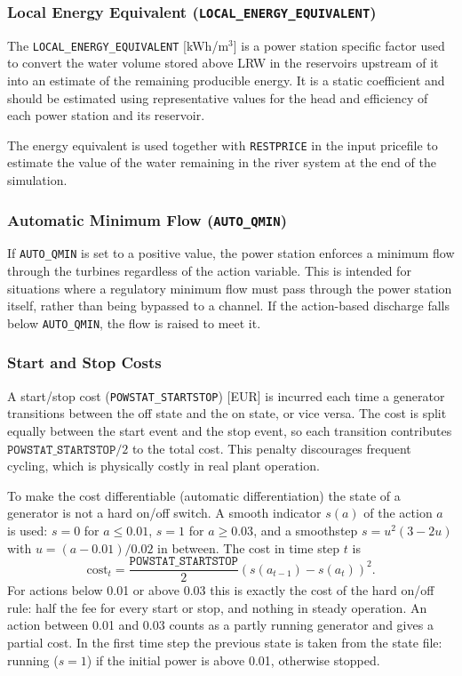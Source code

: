 \documentclass[a4paper, 12pt]{report}
\begin{document}
    \subsubsection{Local Energy Equivalent (\texttt{LOCAL\_ENERGY\_EQUIVALENT})}
    The \texttt{LOCAL\_ENERGY\_EQUIVALENT} [kWh/m$^3$] is a power station specific factor used
    to convert the water volume stored above LRW in the reservoirs upstream of it into an estimate of the remaining producible energy. It is a static coefficient and should be estimated using
    representative values for the head and efficiency of each power station and its reservoir.
    
    The energy equivalent is used together with \texttt{RESTPRICE} in the input pricefile to
    estimate the value of the water remaining in the river system at the end of the simulation.

	\subsubsection{Automatic Minimum Flow (\texttt{AUTO\_QMIN})}

	If \texttt{AUTO\_QMIN} is set to a positive value, the power station enforces a minimum flow
	through the turbines regardless of the action variable. This is intended for situations where
	a regulatory minimum flow must pass through the power station itself, rather than being
	bypassed to a channel. If the action-based discharge falls below \texttt{AUTO\_QMIN}, the
	flow is raised to meet it.

	\subsubsection{Start and Stop Costs}

	A start/stop cost (\texttt{POWSTAT\_STARTSTOP}) [EUR] is incurred each time a generator
	transitions between the off state and the on state, or vice versa. The
	cost is split equally between the start event and the stop event, so each transition
	contributes $\texttt{POWSTAT\_STARTSTOP} / 2$ to the total cost. This penalty discourages
	frequent cycling, which is physically costly in real plant operation.

	To make the cost differentiable (automatic differentiation) the state of a generator is not a hard
	on/off switch. A smooth indicator $s(a)$ of the action $a$ is used: $s = 0$ for $a \le 0.01$, $s = 1$ for
	$a \ge 0.03$, and a smoothstep $s = u^2 (3 - 2u)$ with $u = (a - 0.01)/0.02$ in between. The cost in time step $t$ is
	\begin{equation}
		\mathrm{cost}_t = \frac{\texttt{POWSTAT\_STARTSTOP}}{2} \left( s(a_{t-1}) - s(a_t) \right)^2 .
	\end{equation}
	For actions below 0.01 or above 0.03 this is exactly the cost of the hard on/off rule: half the fee for every start or stop,
	and nothing in steady operation. An action between 0.01 and 0.03 counts as a partly running generator and gives a partial cost.
	In the first time step the previous state is taken from the state file: running ($s = 1$) if the initial power is above 0.01, otherwise stopped.
\end{document}
